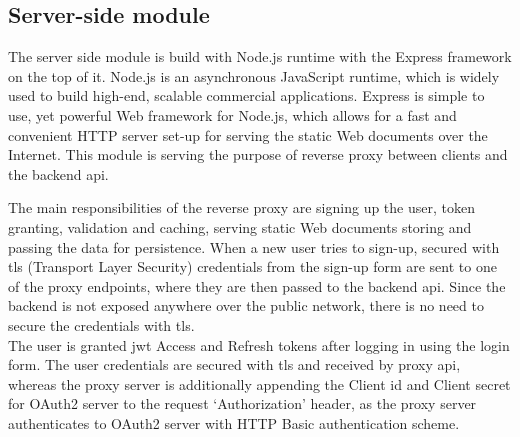 
\subsection{Server-side module}\label{subsec:server-side-module}
The server side module is build with Node.js runtime with the Express framework on the top of it.
Node.js is an asynchronous JavaScript runtime, which is widely used to build high-end, scalable commercial applications.
Express is simple to use, yet powerful Web framework for Node.js, which allows for a fast and convenient HTTP server set-up for serving the static Web documents over the Internet.
This module is serving the purpose of reverse proxy between clients and the backend \gls{api}.

The main responsibilities of the reverse proxy are signing up the user, token granting, validation and caching, serving static Web documents storing and passing the data for persistence.
When a new user tries to sign-up, secured with \gls{tls} (Transport Layer Security) credentials from the sign-up form are sent to one of the proxy endpoints, where they are then passed to the backend \gls{api}.
Since the backend is not exposed anywhere over the public network, there is no need to secure the credentials with \gls{tls}.\\
The user is granted \gls{jwt} Access and Refresh tokens after logging in using the login form.
The user credentials are secured with \gls{tls} and received by proxy \gls{api}, whereas the proxy server is additionally appending the Client id and Client secret for OAuth2 server to the request `Authorization' header, as the proxy server authenticates to OAuth2 server with HTTP Basic authentication scheme.

